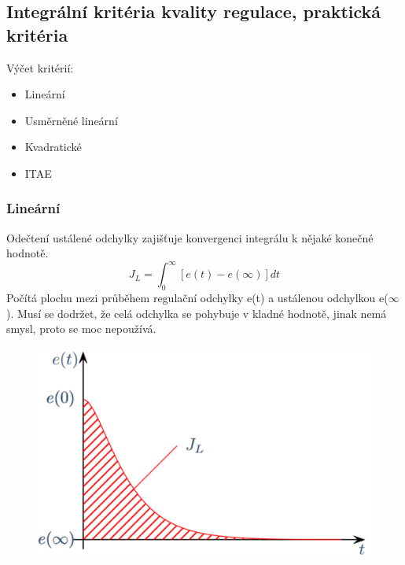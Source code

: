 \subsection*{Integrální kritéria kvality regulace, praktická kritéria}
Výčet kritérií:
\begin{itemize}
    \item Lineární
    \item Usměrněné lineární
    \item Kvadratické
    \item ITAE
\end{itemize}
\newpage

\subsubsection*{Lineární}
Odečtení ustálené odchylky zajišťuje konvergenci integrálu k nějaké konečné hodnotě.\\
\begin{equation}
    J_L = \int^\infty_0[e(t) - e(\infty)]dt
\end{equation}
Počítá plochu mezi průběhem regulační odchylky e(t) a ustálenou odchylkou e(\(\infty\)).
Musí se dodržet, že celá odchylka se pohybuje v kladné hodnotě, jinak nemá smysl, proto se moc nepoužívá.\\
\begin{figure}[H]
    \includegraphics*[scale = 0.3]{images/linearniKriterium.png}
\end{figure}

